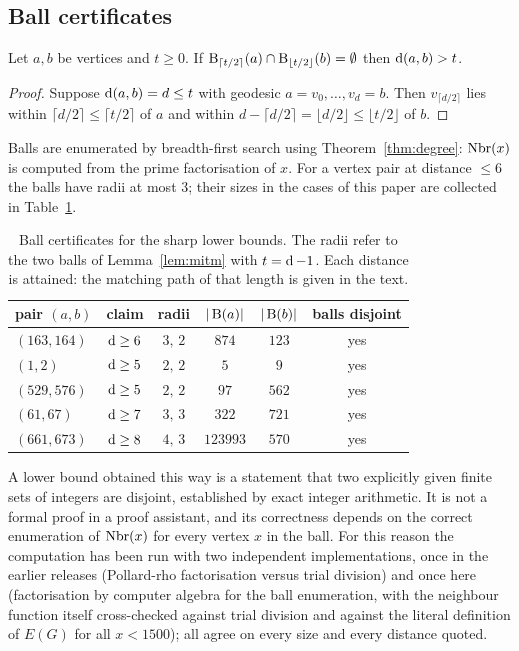 \subsection{Ball certificates}
\begin{lemma}\label{lem:mitm}
Let $a,b$ be vertices and $t\ge0$. If $\operatorname{B}_{\lceil t/2\rceil}(a)\cap\operatorname{B}_{\lfloor t/2\rfloor}(b)=\emptyset$ then $\operatorname{d}(a,b)>t$.
\end{lemma}
\begin{proof} Suppose $\operatorname{d}(a,b)=d\le t$ with geodesic $a=v_0,\dots,v_d=b$. Then $v_{\lceil d/2\rceil}$ lies within $\lceil d/2\rceil\le\lceil t/2\rceil$ of $a$ and within $d-\lceil d/2\rceil=\lfloor d/2\rfloor\le\lfloor t/2\rfloor$ of $b$. \end{proof}
Balls are enumerated by breadth-first search using Theorem~\ref{thm:degree}: $\operatorname{Nbr}(x)$ is computed from the prime factorisation of $x$. For a vertex pair at distance $\le6$ the balls have radii at most $3$; their sizes in the cases of this paper are collected in Table~\ref{tab:balls}.
\begin{table}[ht]\centering\small
\begin{tabular}{@{}lccccc@{}}\toprule
pair $(a,b)$ & claim & radii & $|\operatorname{B}(a)|$ & $|\operatorname{B}(b)|$ & balls disjoint\\\midrule
$(163,164)$ & $\operatorname{d}\ge6$ & $3,\,2$ & $874$ & $123$ & yes\\
$(1,2)$ & $\operatorname{d}\ge5$ & $2,\,2$ & $5$ & $9$ & yes\\
$(529,576)$ & $\operatorname{d}\ge5$ & $2,\,2$ & $97$ & $562$ & yes\\
$(61,67)$ & $\operatorname{d}\ge7$ & $3,\,3$ & $322$ & $721$ & yes\\
$(661,673)$ & $\operatorname{d}\ge8$ & $4,\,3$ & $123993$ & $570$ & yes\\\bottomrule
\end{tabular}
\caption{Ball certificates for the sharp lower bounds. The radii refer to the two balls of Lemma~\ref{lem:mitm} with $t=\operatorname{d}-1$. Each distance is attained: the matching path of that length is given in the text.}\label{tab:balls}\end{table}
\begin{remark}
A lower bound obtained this way is a statement that two explicitly given finite sets of integers are disjoint, established by exact integer arithmetic. It is not a formal proof in a proof assistant, and its correctness depends on the correct enumeration of $\operatorname{Nbr}(x)$ for every vertex $x$ in the ball. For this reason the computation has been run with two independent implementations, once in the earlier releases (Pollard-rho factorisation versus trial division) and once here (factorisation by computer algebra for the ball enumeration, with the neighbour function itself cross-checked against trial division and against the literal definition of $E(G)$ for all $x<1500$); all agree on every size and every distance quoted.
\end{remark}
